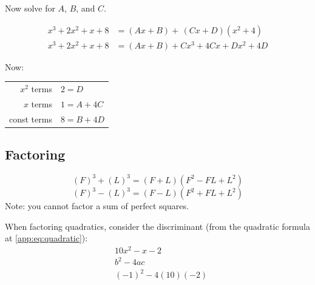 Now solve for \(A\), \(B\), and \(C\).

\begin{align*}
  x^3+2x^2+x+8 &= (Ax+B)+\,(Cx+D)(x^2+4)\\
  x^3+2x^2+x+8 &= (Ax+B)+Cx^3+4Cx+Dx^2+4D
\end{align*}

Now:
\begin{table}[H]
  \centering
  \begin{tabular}{r|l}
    \(x^2\) terms & \( 2=D \) \\
    \(x\) terms & \( 1 = A + 4C  \) \\
    const terms & \( 8 = B + 4D \)
  \end{tabular}
\end{table}

\subsection{Factoring}

\begin{equation}
  (F)^3+(L)^3=(F+L)(F^2-FL+L^2)
\end{equation}
\begin{equation}
  (F)^3-(L)^3=(F-L)(F^2+FL+L^2)
\end{equation}
Note: you cannot factor a sum of perfect squares.
\begin{remark} When factoring quadratics, consider the discriminant (from the quadratic formula at \ref{app:eq:quadratic}):
  \begin{align*}
    &10x^2-x-2 \\
    &b^2-4ac \\
    &(-1)^2-4(10)(-2)
  \end{align*}
\end{remark}

%


